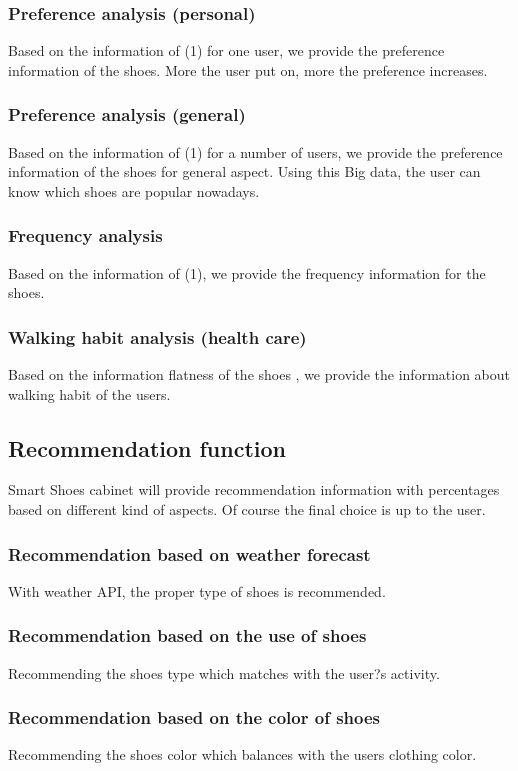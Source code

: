 \documentclass[conference]{IEEEtran}
\begin{document}
\subsubsection{Preference analysis (personal)}
Based on the information of (1) for one user, we provide the preference information of the shoes. More the user put on, more the preference increases.
\subsubsection{Preference analysis (general)}
Based on the information of (1) for a number of users, we provide the preference information of the shoes for general aspect. Using this Big data, the user can know which shoes are popular nowadays.
\subsubsection{Frequency analysis}
Based on the information of (1), we provide the frequency information for the shoes.\subsubsection{Walking habit analysis (health care)}
Based on the information flatness of the shoes , we provide the information about walking habit of the users.


\subsection{Recommendation function}
Smart Shoes cabinet will provide recommendation information with percentages based on different kind of aspects. Of course the final choice is up to the user.
\subsubsection{Recommendation based on weather forecast }
With weather API, the proper type of shoes is recommended.
\subsubsection{ Recommendation based on the use of shoes}
Recommending the shoes type which matches with the user?s activity.
\subsubsection{Recommendation based on the color of shoes}
Recommending the shoes color which balances with the users clothing color.
\end{document}
